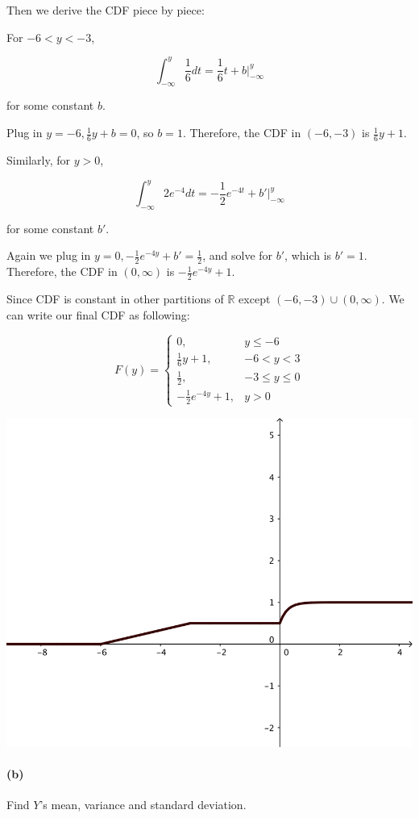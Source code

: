 \documentclass[a4paper, 11pt, twoside]{article}
\begin{document}
Then we derive the CDF piece by piece:

For $-6<y<-3$,

\[\int^y_{-\infty}\frac{1}{6}dt=\frac{1}{6}t+b\bigg\rvert^y_{-\infty}\]

for some constant $b$.

Plug in $y=-6, \frac{1}{6}y+b=0$, so $b=1$. Therefore, the CDF in $(-6,-3)$ is $\frac{1}{6}y+1.$

Similarly, for $y>0$,

\[\int^y_{-\infty}2e^{-4}dt=-\frac12e^{-4t}+b'\bigg\rvert^y_{-\infty}\]

for some constant $b'$.

Again we plug in $y=0, -\frac{1}{2}e^{-4y}+b'=\frac{1}{2}$, and solve for $b'$, which is $b'=1$. Therefore, the CDF in $(0, \infty)$ is $-\frac{1}{2}e^{-4y}+1$.

Since CDF is constant in other partitions of $\mathbb{R}$ except $(-6, -3)\cup (0,\infty)$. We can write our final CDF as following:

\[
F(y)=
\begin{cases}
0, &y \leq -6\\
\frac{1}{6}y+1, &-6 < y < 3\\
\frac{1}{2}, &-3\leq y\leq 0\\
-\frac{1}{2}e^{-4y}+1, &y > 0
\end{cases}
\]

\includegraphics{image/1a-cdf}

\paragraph{(b)} Find $Y$'s mean, variance and standard deviation.
\end{document}
